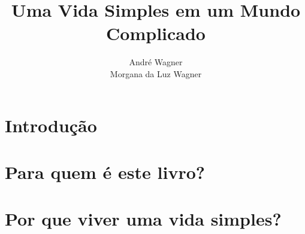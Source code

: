 \documentclass[12pt,b5paper]{book}
\author{André Wagner \\ Morgana da Luz Wagner}
\title{Uma Vida Simples em um Mundo Complicado}
\date{}
\begin{document}
\maketitle
\tableofcontents

\chapter*{Introdução}

\chapter{Para quem é este livro?}

\chapter{Por que viver uma vida simples?}

\end{document}

